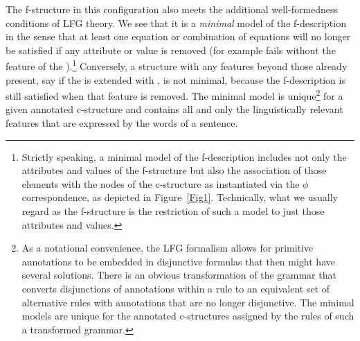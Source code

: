 \documentclass[output=paper,hidelinks]{langscibook}
\begin{document}
The f-structure in this configuration also meets the additional well-formedness conditions of LFG theory.  We see that it is a \emph{minimal} model of the f-description in the sense that at least one equation or combination of equations will no longer be satisfied if any attribute or value is removed (for example  fails without the  feature of the ).\footnote{Strictly speaking, a minimal model of the f-description includes not only the attributes and values of the f-structure but also the association of those elements with the nodes of the c-structure as instantiated via the $\phi$ correspondence, as depicted in Figure~\ref{Fig1}. Technically, what we usually regard as the f-structure is the restriction of such a model to just those attributes and values.}  Conversely, a structure with any features beyond those already present, say if the  is extended with , is not minimal, because the f-description is still satisfied when that feature is removed.  The minimal model is unique\footnote{As a notational convenience, the LFG formalism allows for primitive annotations to be embedded in disjunctive formulas that then might have several solutions.  There is an obvious transformation of the grammar that converts disjunctions of annotations within a rule to an equivalent set of alternative rules with annotations that are no longer disjunctive.  The minimal models are unique for the annotated c-structures assigned by the rules of such a transformed grammar.} for a given annotated c-structure and  contains all and only the linguistically relevant features that are expressed by the words of a sentence.  
\end{document}
